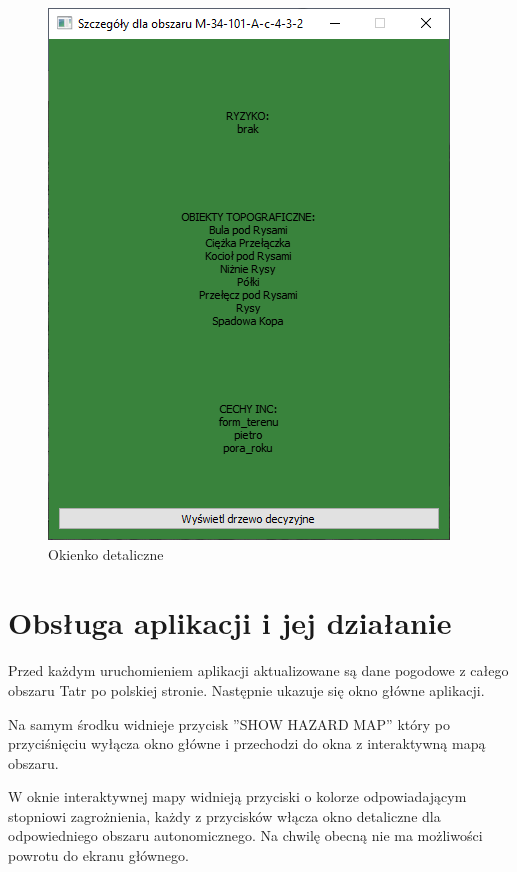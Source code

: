 \begingroup
\begin{figure}[h]
	\centering
	\includegraphics[scale=0.6]{detail_window.png}
	\caption{Okienko detaliczne}
\end{figure}
\endgroup
\clearpage
\section{Obsługa aplikacji i jej działanie}
Przed każdym uruchomieniem aplikacji aktualizowane są dane pogodowe z całego obszaru Tatr po polskiej stronie. Następnie ukazuje się okno główne aplikacji.

Na samym środku widnieje przycisk ''SHOW HAZARD MAP'' który po przyciśnięciu wyłącza okno główne i przechodzi do okna z interaktywną mapą obszaru.

W oknie interaktywnej mapy widnieją przyciski o kolorze odpowiadającym stopniowi zagrożnienia, każdy z przycisków włącza okno detaliczne dla odpowiedniego obszaru autonomicznego. Na chwilę obecną nie ma możliwości powrotu do ekranu głównego.








